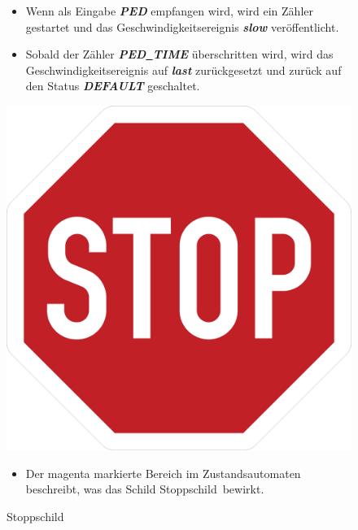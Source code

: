 \begin{figure}[h]
\begin{minipage}[t]{10cm}
\begin{itemize}
			\item Wenn als Eingabe \textbf{\textit{PED}} empfangen wird, wird ein Z\"ahler gestartet und das Geschwindigkeitsereignis \textbf{\textit{slow}} ver\"offentlicht.
			
			\item Sobald der Z\"ahler \textbf{\textit{PED\underline{\ }TIME}} \"uberschritten wird, wird das Geschwindigkeitsereignis auf \textbf{\textit{last}} zur\"uckgesetzt und zur\"uck auf den Status \textbf{\textit{DEFAULT}} geschaltet.
		\end{itemize}
	\end{minipage}
\end{figure}


\begin{figure}[h]
	\begin{minipage}[t]{4cm}
		\vspace{0pt}
		\centering
		\includegraphics[scale=0.04]{images/STOP.jpg}
		\caption{Stoppschild}
		\label{fig:PED}
	\end{minipage}
	\hfill
	\begin{minipage}[t]{10cm}
		\vspace{0pt}
		\begin{itemize}
			\item Der magenta markierte Bereich im Zustandsautomaten beschreibt, was das Schild \glqq Stoppschild\grqq \ bewirkt.
			

\end{itemize}
\end{minipage}
\end{figure}
